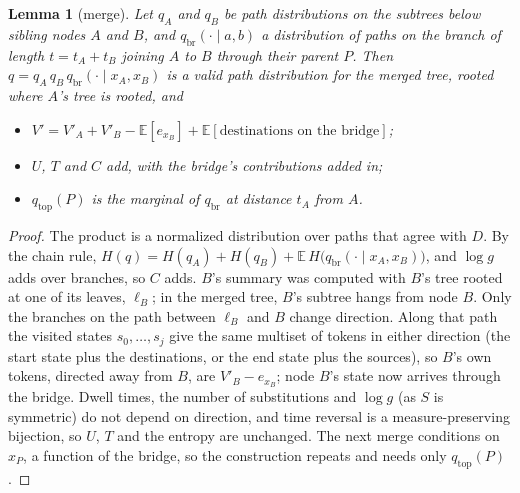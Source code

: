\documentclass[11pt]{article}
\newtheorem{lemma}{Lemma}
\newcommand{\E}{\mathbb E}
\begin{document}
\begin{lemma}[merge]\label{lem:merge}
Let $q_A$ and $q_B$ be path distributions on the subtrees below sibling nodes
$A$ and $B$, and $q_{\mathrm{br}}(\cdot\mid a,b)$ a distribution of paths on
the branch of length $t=t_A+t_B$ joining $A$ to $B$ through their parent $P$.
Then $q=q_A\,q_B\,q_{\mathrm{br}}(\cdot\mid x_A,x_B)$ is a valid path
distribution for the merged tree, rooted where $A$'s tree is rooted, and
\begin{itemize}
\item $V'=V'_A+V'_B-\E[e_{x_B}]+\E[\text{destinations on the bridge}]$;
\item $U$, $T$ and $C$ add, with the bridge's contributions added in;
\item $q_{\mathrm{top}}(P)$ is the marginal of $q_{\mathrm{br}}$ at distance
  $t_A$ from $A$.
\end{itemize}
\end{lemma}
\begin{proof}
The product is a normalized distribution over paths that agree with $D$. By
the chain rule,
$H(q)=H(q_A)+H(q_B)+\E\,H\big(q_{\mathrm{br}}(\cdot\mid x_A,x_B)\big)$, and
$\log g$ adds over branches, so $C$ adds.
$B$'s summary was computed with $B$'s tree rooted at one of its leaves,
$\ell_B$; in the merged tree, $B$'s subtree hangs from node $B$. Only the
branches on the path between $\ell_B$ and $B$ change direction. Along that
path the visited states $s_0,\dots,s_j$ give the same multiset of tokens in
either direction (the start state plus the destinations, or the end state plus
the sources), so $B$'s own tokens, directed away from $B$, are
$V'_B-e_{x_B}$; node $B$'s state now arrives through the bridge. Dwell times,
the number of substitutions and $\log g$ (as $S$ is symmetric) do not depend
on direction, and time reversal is a measure-preserving bijection, so $U$,
$T$ and the entropy are unchanged. The next merge conditions on $x_P$, a
function of the bridge, so the construction repeats and needs only
$q_{\mathrm{top}}(P)$.
\end{proof}
\end{document}

